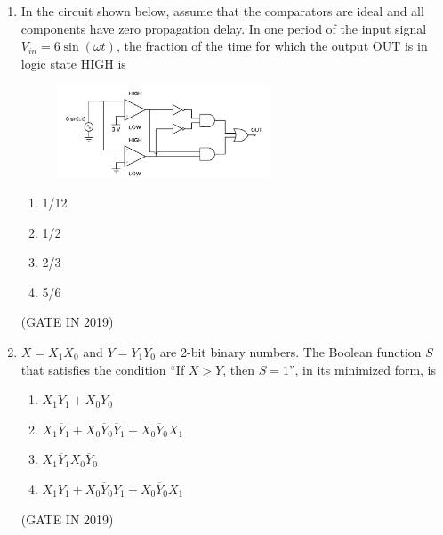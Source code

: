 \documentclass[journal]{IEEEtran}
\begin{document}
\begin{enumerate}
\item In the circuit shown below, assume that the comparators are ideal and all components have zero propagation delay. In one period of the input signal $V_{in} = 6 \sin(\omega t)$, the fraction of the time for which the output OUT is in logic state HIGH is
\begin{figure}[H]
    \centering
    \includegraphics[width=0.6\textwidth]{13.png}
    \caption{}
    \label{fig:fig13}
\end{figure}
\begin{multicols}{4}
\begin{enumerate}
\item 1/12
\item 1/2
\item 2/3
\item 5/6
\end{enumerate}
\end{multicols} \hfill(GATE IN 2019)

\item $X = X_1X_0$ and $Y = Y_1Y_0$ are 2-bit binary numbers. The Boolean function $S$ that satisfies the condition ``If $X > Y$, then $S = 1$'', in its minimized form, is
\begin{enumerate}
\item $X_1Y_1 + X_0Y_0$
\item $X_1\overline{Y}_1 + X_0\overline{Y}_0\overline{Y}_1 + X_0\overline{Y}_0X_1$
\item $X_1\overline{Y}_1X_0\overline{Y}_0$
\item $X_1Y_1 + X_0\overline{Y}_0Y_1 + X_0\overline{Y}_0X_1$
\end{enumerate}
 \hfill(GATE IN 2019)


\end{enumerate}
\end{document}
